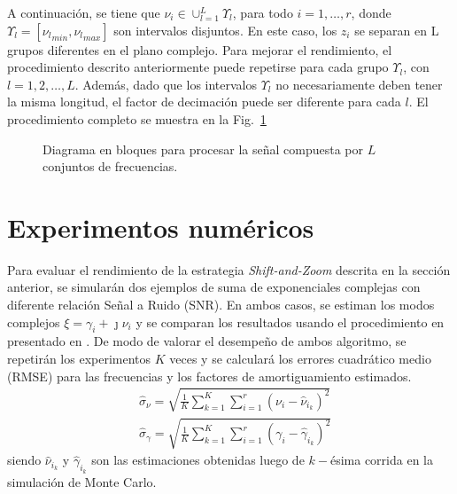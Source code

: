 			A continuación, se tiene que $\nu_i\in\cup_{l=1}^L\Upsilon_l$, para todo $i=1,\ldots,r$, donde $\Upsilon_l = [{\nu_l}_{min},{\nu_l}_{max}]$ son intervalos disjuntos. En este caso, los $z_i$ se separan en L grupos diferentes en el plano complejo. Para mejorar el rendimiento, el procedimiento descrito anteriormente puede repetirse para cada grupo $\Upsilon_l$, con $l=1,2,\ldots,L$. Además, dado que los intervalos $\Upsilon_l$ no necesariamente deben tener la misma longitud, el factor de decimación puede ser diferente para cada $l$. El procedimiento completo se muestra en la Fig.~\ref{Fig:BlockDiagram3}
	
			\begin{figure}[t]
				\centering
				\resizebox{\linewidth}{!}{}
				\caption{Diagrama en bloques para procesar la señal compuesta por $L$ conjuntos de frecuencias.}
				\label{Fig:BlockDiagram3}
			\end{figure}
	
	\section{Experimentos numéricos}
	
		Para evaluar el rendimiento de la estrategia \emph{Shift-and-Zoom} descrita en la sección anterior, se simularán dos ejemplos de suma de exponenciales complejas con diferente relación Señal a Ruido (SNR). En ambos casos, se estiman los modos complejos $\xi = \gamma_i+\jmath\nu_i$ y se comparan los resultados usando el procedimiento en presentado en \cite{Andersson2014}. De modo de valorar el desempeño de ambos algoritmo, se repetirán los experimentos $K$ veces y se calculará los errores cuadrático medio (RMSE) para las frecuencias y los factores de amortiguamiento estimados.
		\begin{equation}
			\begin{aligned}
				& \hat{\sigma}_{\nu} = \sqrt{\frac{1}{K}\sum_{k=1}^{K}\sum_{i=1}^{r}(\nu_i - \hat{\nu}_{i_k})^2} \\[0.3em]
				& \hat{\sigma}_{\gamma} = \sqrt{\frac{1}{K}\sum_{k=1}^{K}\sum_{i=1}^{r}(\gamma_i-\hat{\gamma}_{i_k})^2}
			\end{aligned}
			\label{Eq:RMSE}	
		\end{equation}
		siendo $\hat{\nu}_{i_k}$ y $\hat{\gamma}_{i_k}$ son las estimaciones obtenidas luego de $k-$ésima corrida en la simulación de Monte Carlo.

